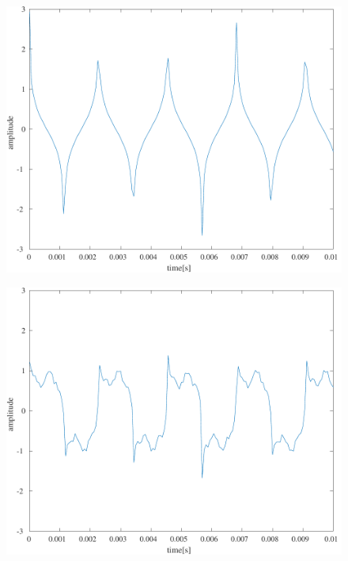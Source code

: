 \begin{figure}[H]
\begin{minipage}[b]{.24\textwidth}
        \label{fig:実験結果矩形波_p4PI}
    \end{minipage}
    \begin{minipage}[b]{.24\textwidth}
        \centering
        \includegraphics[keepaspectratio,width=\textwidth]{../../Figures/03_13.pdf}
        \label{fig:実験結果矩形波_p2PI}
    \end{minipage}
    \begin{minipage}[b]{.24\textwidth}
        \centering
        \includegraphics[keepaspectratio,width=\textwidth]{../../Figures/03_14.pdf}

\end{minipage}
\end{figure}
